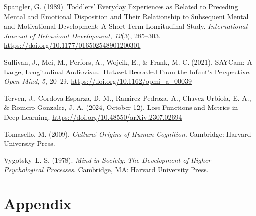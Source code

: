 \documentclass[
  man,floatsintext]{apa6}
\newlength{\cslhangindent}
\newenvironment{CSLReferences}[2] %
 {\begin{list}{}{%
  \setlength{\itemindent}{0pt}
  \setlength{\leftmargin}{0pt}
  \setlength{\parsep}{0pt}
  \ifodd #1
   \setlength{\leftmargin}{\cslhangindent}
   \setlength{\itemindent}{-1\cslhangindent}
  \fi
  \setlength{\itemsep}{#2\baselineskip}}}
 {\end{list}}
\begin{document}
\begin{CSLReferences}{1}{0}
Spangler, G. (1989). Toddlers' {Everyday Experiences} as {Related} to {Preceding Mental} and {Emotional Disposition} and {Their Relationship} to {Subsequent Mental} and {Motivational Development}: {A Short-Term Longitudinal Study}. \emph{International Journal of Behavioral Development}, \emph{12}(3), 285--303. \url{https://doi.org/10.1177/016502548901200301}

Sullivan, J., Mei, M., Perfors, A., Wojcik, E., \& Frank, M. C. (2021). {SAYCam}: {A Large}, {Longitudinal Audiovisual Dataset Recorded From} the {Infant}'s {Perspective}. \emph{Open Mind}, \emph{5}, 20--29. \url{https://doi.org/10.1162/opmi_a_00039}

Terven, J., Cordova-Esparza, D. M., Ramirez-Pedraza, A., Chavez-Urbiola, E. A., \& Romero-Gonzalez, J. A. (2024, October 12). Loss {Functions} and {Metrics} in {Deep Learning}. \url{https://doi.org/10.48550/arXiv.2307.02694}

Tomasello, M. (2009). \emph{Cultural {Origins} of {Human Cognition}}. Cambridge: Harvard University Press.

Vygotsky, L. S. (1978). \emph{Mind in {Society}: {The Development} of {Higher Psychological Processes}}. Cambridge, MA: Harvard University Press.

\end{CSLReferences}

\endgroup

\newpage

\section{Appendix}\label{appendix}
\end{document}
